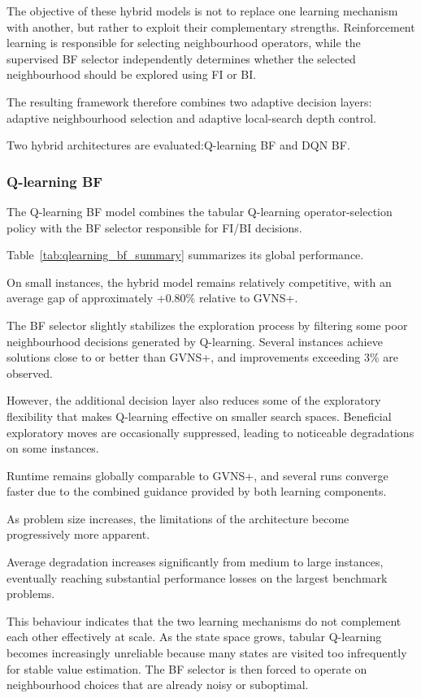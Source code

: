 The objective of these hybrid models is not to replace one learning mechanism with another, but rather to exploit their complementary strengths. Reinforcement learning is responsible for selecting neighbourhood operators, while the supervised BF selector independently determines whether the selected neighbourhood should be explored using FI or BI.

The resulting framework therefore combines two adaptive decision layers: adaptive neighbourhood selection and adaptive local-search depth control.

Two hybrid architectures are evaluated:Q-learning BF and DQN BF.

\subsubsection{Q-learning BF}
The Q-learning BF model combines the tabular Q-learning operator-selection policy with the BF selector responsible for FI/BI decisions.

Table~\ref{tab:qlearning_bf_summary} summarizes its global performance.


On small instances, the hybrid model remains relatively competitive, with an average gap of approximately +0.80\% relative to GVNS+.

The BF selector slightly stabilizes the exploration process by filtering some poor neighbourhood decisions generated by Q-learning. Several instances achieve solutions close to or better than GVNS+, and improvements exceeding 3\% are observed.

However, the additional decision layer also reduces some of the exploratory flexibility that makes Q-learning effective on smaller search spaces. Beneficial exploratory moves are occasionally suppressed, leading to noticeable degradations on some instances.

Runtime remains globally comparable to GVNS+, and several runs converge faster due to the combined guidance provided by both learning components.

As problem size increases, the limitations of the architecture become progressively more apparent.

Average degradation increases significantly from medium to large instances, eventually reaching substantial performance losses on the largest benchmark problems.

This behaviour indicates that the two learning mechanisms do not complement each other effectively at scale. As the state space grows, tabular Q-learning becomes increasingly unreliable because many states are visited too infrequently for stable value estimation. The BF selector is then forced to operate on neighbourhood choices that are already noisy or suboptimal.

